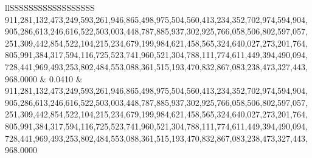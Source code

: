 \begin{table}
\begin{tabular}{llSSSSSSSSSSSSSSSSSS}
911,281,132,473,249,593,261,946,865,498,975,504,560,413,234,352,702,974,594,904,905,286,613,246,616,522,503,003,448,787,885,937,302,925,766,058,506,802,597,057,251,309,442,854,522,104,215,234,679,199,984,621,458,565,324,640,027,273,201,764,805,991,384,317,594,116,725,523,741,960,521,304,788,111,774,611,449,394,490,094,728,441,969,493,253,802,484,553,088,361,515,193,470,832,867,083,238,473,327,443,968.0000 & 0.0410 & 911,281,132,473,249,593,261,946,865,498,975,504,560,413,234,352,702,974,594,904,905,286,613,246,616,522,503,003,448,787,885,937,302,925,766,058,506,802,597,057,251,309,442,854,522,104,215,234,679,199,984,621,458,565,324,640,027,273,201,764,805,991,384,317,594,116,725,523,741,960,521,304,788,111,774,611,449,394,490,094,728,441,969,493,253,802,484,553,088,361,515,193,470,832,867,083,238,473,327,443,968.0000 \\

\end{tabular}
\end{table}

